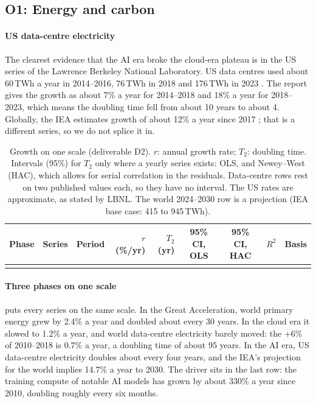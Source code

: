 \subsection{O1: Energy and carbon}\label{sec:o1}

\paragraph{US data-centre electricity} The clearest evidence that the AI era broke the cloud-era plateau is in the US
series of the Lawrence Berkeley National Laboratory. US data centres used about 60\,TWh a year in 2014--2016, 76\,TWh in
2018 and 176\,TWh in 2023 \citep{shehabi2024}. The report gives the growth as about 7\% a year for 2014--2018 and 18\%
a year for 2018--2023, which means the doubling time fell from about 10 years to about 4. Globally, the IEA estimates
growth of about 12\% a year since 2017 \citep{iea2025}; that is a different series, so we do not splice it in.

\begin{table}[t]\centering
\caption{Growth on one scale (deliverable D2). $r$: annual growth rate; $T_2$: doubling time. Intervals (95\%) for
$T_2$ only where a yearly series exists: OLS, and Newey--West (HAC), which allows for serial correlation in the
residuals. Data-centre rows rest on two published values each, so they have no interval. The US rates are approximate,
as stated by LBNL. The world 2024--2030 row is a projection (IEA base case: 415 to 945\,TWh).}
\label{tab:growth}
\footnotesize\renewcommand{\arraystretch}{1.1}\setlength{\tabcolsep}{4.2pt}
\begin{tabular}{@{}P{1.95cm} P{3.0cm} l r r c c c P{2.4cm}@{}}
\toprule
Phase & Series & Period & $r$ (\%/yr) & $T_2$ (yr) & 95\% CI, OLS & 95\% CI, HAC & $R^2$ & Basis \\
\midrule
{}
\bottomrule
\end{tabular}
\end{table}

\paragraph{Three phases on one scale}  puts every series on the same scale. In the Great Acceleration,
world primary energy grew by 2.4\% a year and doubled about every 30 years. In the cloud era it slowed to 1.2\% a year,
and world data-centre electricity barely moved: the +6\% of 2010--2018 is 0.7\% a year, a doubling time of about 95
years. In the AI era, US data-centre electricity doubles about every four years, and the IEA's projection for the world
implies 14.7\% a year to 2030. The driver sits in the last row: the training compute of notable AI models has grown by
about 330\% a year since 2010, doubling roughly every six months.

